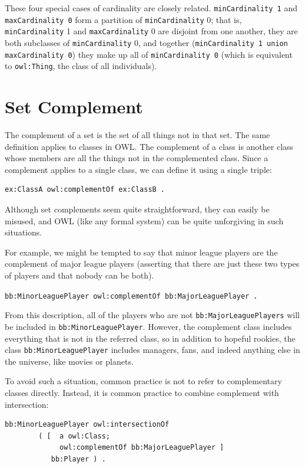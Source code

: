 These four special cases of cardinality are closely related.
\texttt{minCardinality 1} and \texttt{maxCardinality 0} form a partition of \texttt{minCardinality}
0; that is, \texttt{minCardinality} 1 and \texttt{maxCardinality} 0 are disjoint from one
another, they are both subclasses of \texttt{minCardinality} 0, and together
(\texttt{minCardinality 1 union maxCardinality 0}) they make up all of
\texttt{minCardinality 0} (which is equivalent to \texttt{owl:Thing}, the class of all
individuals).

\section{Set Complement}

The complement of a set is the set of all things not in that set. The
same definition applies to classes in OWL. The complement of a class is
another class whose members are all the things not in the complemented
class. Since a complement applies to a single class, we can define it
using a single triple:

\begin{lstlisting}
ex:ClassA owl:complementOf ex:ClassB .
\end{lstlisting}

Although set complements seem quite straightforward, they can easily be
misused, and OWL (like any formal system) can be quite unforgiving in
such situations.

For example, we might be tempted to say that minor league players are
the complement of major league players (asserting that there are just
these two types of players and that nobody can be both).

\texttt{bb:MinorLeaguePlayer owl:complementOf bb:MajorLeaguePlayer .
}

From this description, all of the players who are not
\texttt{bb:MajorLeaguePlayers} will be included in \texttt{bb:MinorLeaguePlayer}. However,
the complement class includes everything that is not in the referred
class, so in addition to hopeful rookies, the class \texttt{bb:MinorLeaguePlayer}
includes managers, fans, and indeed anything else in the universe, like
movies or planets.

To avoid such a situation, common practice is not to refer to
complementary classes directly. Instead, it is common practice to
combine complement with intersection:

\begin{lstlisting}
bb:MinorLeaguePlayer owl:intersectionOf
        ( [  a owl:Class;
             owl:complementOf bb:MajorLeaguePlayer ]
           bb:Player ) .
\end{lstlisting}

